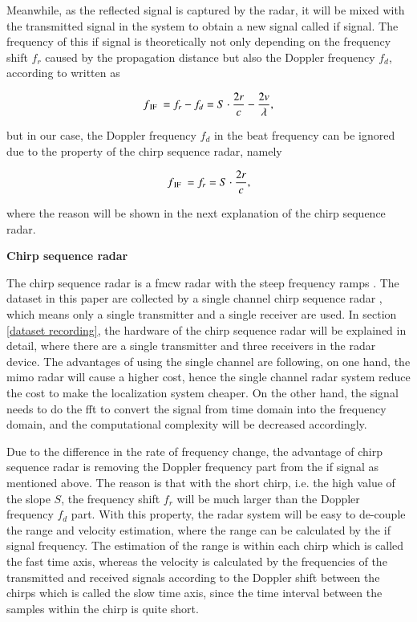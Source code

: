 Meanwhile, as the reflected signal is captured by the radar, it will be mixed with the transmitted signal in the system to obtain a new signal called \gls{if} signal. The frequency of this \gls{if} signal is theoretically not only depending on the frequency shift $f_r$ caused by the propagation distance but also the Doppler frequency $f_d$, according to \cite{7556357} written as

\begin{equation}
    \centering
    f\textsubscript{IF}\ = f_r - f_d = S \cdot \frac{2r}{c} - \frac{2v}{\lambda},
\end{equation}

but in our case, the Doppler frequency $f_d$ in the beat frequency can be ignored due to the property of the chirp sequence radar, namely

\begin{equation}
    \centering
    f\textsubscript{IF}\ = f_r = S \cdot \frac{2r}{c},
\end{equation}

where the reason will be shown in the next explanation of the chirp sequence radar.

\begin{spacing}{1.5}
\textbf{\large{Chirp sequence radar}}
\end{spacing}

The chirp sequence radar is a \gls{fmcw} radar with the steep frequency ramps \cite{fink_comparison_2015}. The dataset in this paper are collected by a single channel chirp sequence radar \cite{ag_bgt60tr13c_nodate}, which means only a single transmitter and a single receiver are used. In section \ref{dataset recording}, the hardware of the chirp sequence radar will be explained in detail, where there are a single transmitter and three receivers in the radar device. The advantages of using the single channel are following, on one hand, the \gls{mimo} radar will cause a higher cost, hence the single channel radar system reduce the cost to make the localization system cheaper. On the other hand, the signal needs to do the \gls{fft} to convert the signal from time domain into the frequency domain, and the computational complexity will be decreased accordingly.

Due to the difference in the rate of frequency change, the advantage of chirp sequence radar is removing the Doppler frequency part from the \gls{if} signal as mentioned above. The reason is that with the short chirp, i.e. the high value of the slope $S$, the frequency shift $f_r$ will be much larger than the Doppler frequency $f_d$ part. With this property, the radar system will be easy to de-couple the range and velocity estimation, where the range can be calculated by the \gls{if} signal frequency. The estimation of the range is within each chirp which is called the fast time axis, whereas the velocity is calculated by the frequencies of the transmitted and received signals according to the Doppler shift between the chirps which is called the slow time axis, since the time interval between the samples within the chirp is quite short.

